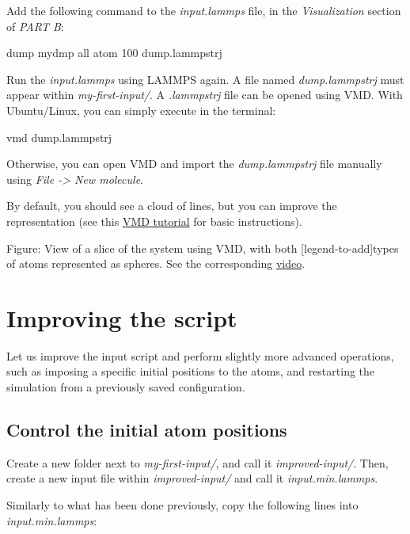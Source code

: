 \vspace{0.25cm} \noindent Add the following command to the \textit{input.lammps} file,
in the \textit{Visualization} section of \textit{PART B}:

\begin{lcverbatim}
dump mydmp all atom 100 dump.lammpstrj
\end{lcverbatim}

\noindent Run the \textit{input.lammps} using LAMMPS again. A file named \textit{dump.lammpstrj}
must appear within \textit{my-first-input/}. A \textit{.lammpstrj} file can
be opened using VMD. With Ubuntu/Linux, you can simply execute in the terminal:

\begin{lcverbatim}
vmd dump.lammpstrj
\end{lcverbatim}

\noindent Otherwise, you can open VMD and import the \textit{dump.lammpstrj}
file manually using \textit{File -> New molecule}.

\vspace{0.25cm} \noindent By default, you should see a cloud
of lines, but you can improve the representation (see this \hyperref[vmd-label]{VMD tutorial}
for basic instructions).

\vspace{0.25cm} Figure: View of a slice of the system using VMD, with both
[legend-to-add]types of atoms represented as spheres. See the corresponding \href{https://youtu.be/vdSIJM5fVJE}{video}.

\section{Improving the script}
\noindent Let us improve the input script and perform slightly more
advanced operations, such as imposing a specific initial
positions to the atoms, and restarting the simulation
from a previously saved configuration. 

\subsection{Control the initial atom positions}
\noindent Create a new folder next to \textit{my-first-input/}, and call
it \textit{improved-input/}. Then, create a new input file within \textit{improved-input/}
and call it \textit{input.min.lammps}.

\vspace{0.25cm} \noindent Similarly to what has been done previously, copy the following lines
into \textit{input.min.lammps}:

